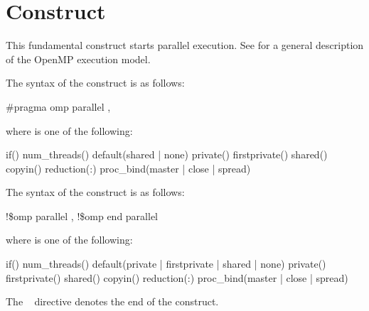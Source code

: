 \section{ Construct}
\label{sec:parallel Construct}
\summary
This fundamental construct starts parallel execution. See 
for a general description of the OpenMP execution model.

\syntax
\ccppspecificstart
The syntax of the  construct is as follows:
\begin{boxedcode}
\#pragma omp parallel \plc{[clause[ [},\plc{] clause] ... ] new-line}
\end{boxedcode}

where  is one of the following:

\begin{indentedcodelist}
if()
num\_threads()
default(shared \textnormal{|} none)
private()
firstprivate()
shared()
copyin()
reduction(:)
proc\_bind(master \textnormal{|} close \textnormal{|} spread)
\end{indentedcodelist}
\ccppspecificend

\fortranspecificstart
The syntax of the  construct is as follows:

\begin{boxedcode}
!\$omp parallel \plc{[clause[ [},\plc{] clause] ... ]}
!\$omp end parallel
\end{boxedcode}

\begin{samepage}
where  is one of the following:

\begin{indentedcodelist}
if()
num\_threads()
default(private \textnormal{|} firstprivate \textnormal{|} shared \textnormal{|} none)
private()
firstprivate()
shared()
copyin()
reduction(:)
proc\_bind(master \textnormal{|} close \textnormal{|} spread)
\end{indentedcodelist}
\end{samepage}

The ~ directive denotes the end of the  construct.
\fortranspecificend

